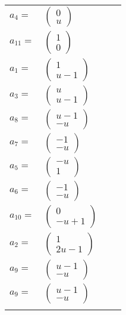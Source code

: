 \documentclass[1p]{elsarticle_modified}
\theoremstyle{definition}
\begin{document}
\begin{tabular}{m{7pt} m{180pt} m{7pt} m{180pt} }
\flushright $a_{4}=$&$\begin{pmatrix}0\\u\end{pmatrix}$ \\
\flushright $a_{11}=$&$\begin{pmatrix}1\\0\end{pmatrix}$ \\
\flushright $a_{1}=$&$\begin{pmatrix}1\\u-1\end{pmatrix}$ \\
\flushright $a_{3}=$&$\begin{pmatrix}u\\u-1\end{pmatrix}$ \\
\flushright $a_{8}=$&$\begin{pmatrix}u-1\\- u\end{pmatrix}$ \\
\flushright $a_{7}=$&$\begin{pmatrix}-1\\- u\end{pmatrix}$ \\
\flushright $a_{5}=$&$\begin{pmatrix}- u\\1\end{pmatrix}$ \\
\flushright $a_{6}=$&$\begin{pmatrix}-1\\- u\end{pmatrix}$ \\
\flushright $a_{10}=$&$\begin{pmatrix}0\\- u+1\end{pmatrix}$ \\
\flushright $a_{2}=$&$\begin{pmatrix}1\\2 u-1\end{pmatrix}$ \\
\flushright $a_{9}=$&$\begin{pmatrix}u-1\\- u\end{pmatrix}$\\ \flushright $a_{9}=$&$\begin{pmatrix}u-1\\- u\end{pmatrix}$\\&\end{tabular}
\end{document}
